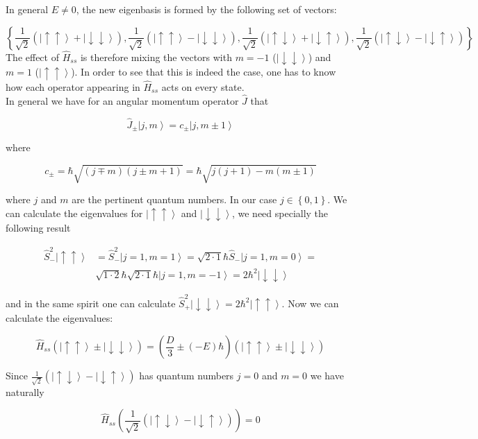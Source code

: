 \documentclass[A4paper, 12pt]{article}
\newcommand{\uu}{\left | \uparrow\uparrow \right \rangle}
\newcommand{\dd}{\left | \downarrow\downarrow \right \rangle}
\newcommand{\du}{\left | \downarrow\uparrow \right \rangle}
\newcommand{\ud}{\left | \uparrow\downarrow \right \rangle}
\newcommand{\mone}{\frac{1}{\sqrt{2}}\left( \ud + \du\right)}
\newcommand{\mmone}{\frac{1}{\sqrt{2}}\left( \ud - \du\right)}
\newcommand{\x}{\frac{1}{\sqrt 2}\left( \uu + \dd\right)}
\newcommand{\y}{\frac{1}{\sqrt 2}\left( \uu - \dd\right)}
\begin{document}
In general $ E\neq 0 $, the new eigenbasis is formed by the following set of vectors:

\begin{equation}
  \label{eq:basis-of-spin-spin-hamiltonian}
  \left\{\x, \y,\mone,  \mmone \right\}
\end{equation}
The effect of $ \hat{H}_{ss}  $ is therefore mixing the vectors with $ m=-1 $
($ \dd $)  and $ m=1 $  ($ \uu $).  In order to see that this is indeed the
case, one has to know how each operator appearing in $ \hat{H} _{ss}  $  acts
on every state.\\

In general we have for an angular momentum operator $ \hat{J}  $ that

\begin{equation}
  \hat{J} _{\pm} \left | j, m \right \rangle = c _{\pm} \left | j,m \pm 1 \right \rangle
\end{equation}

where

\begin{equation}
  c _{\pm}  = \hbar \sqrt{(j\mp m)(j \pm m +1)} = \hbar \sqrt{j (j+1) - m (m\pm 1) }
\end{equation}

where $ j $ and $ m $ are the pertinent quantum numbers. In our case $ j \in
\left \{0,1 \right \}  $.  We can calculate the eigenvalues for $ \uu $ and $
\dd $, we need specially the following result

\begin{align*}
  \hat{S} _{-} ^{2} \uu &=
  \hat{S} _{-} ^{2} \left | j=1, m=1 \right \rangle =
  \sqrt{2\cdot 1} \hbar \hat{S} _{-}  \left | j=1, m=0 \right \rangle = \\
  &
  \sqrt{1\cdot 2} \hbar  \sqrt{2\cdot 1} \hbar  \left | j=1, m=-1 \right \rangle =
  2\hbar ^{2} \dd
\end{align*}

and in the same spirit one can calculate $ \hat{S} _{+} ^{2} \dd = 2 \hbar ^{2} \uu  $.
Now we can calculate the eigenvalues:

\begin{equation}
  \hat{H} _{ss} \left( \uu \pm \dd \right)
  =
  \left(
    \frac{D}{3}\pm (-E)\hbar
  \right)
  \left(
    \uu \pm \dd
  \right)
\end{equation}

Since $ \mmone $ has quantum numbers $ j=0 $ and $ m=0 $ we have naturally

\begin{equation*}
  \hat{H} _{ss} \left( \mmone \right) = 0
\end{equation*}
\end{document}
